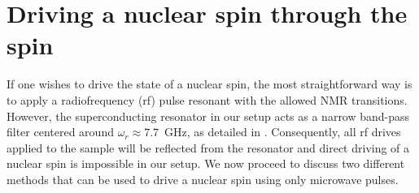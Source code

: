


\section{Driving a \W nuclear spin through the \Er spin}

If one wishes to drive the state of a nuclear spin, the most straightforward way is to apply a radiofrequency (rf) pulse resonant with the allowed NMR transitions. However, the superconducting resonator in our setup acts as a narrow band-pass filter centered around $\omega_r\approx7.7$~GHz, as detailed in . Consequently, all rf drives applied to the sample will be reflected from the resonator and direct driving of a nuclear spin is impossible in our setup. We now proceed to discuss two different methods that can be used to drive a nuclear spin using only microwave pulses.

